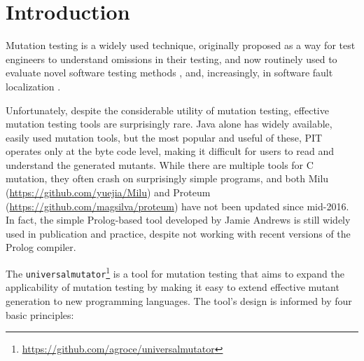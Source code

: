 \section{Introduction}

Mutation testing \cite{PracProg,Mut2000} is a widely used technique,
originally proposed as a way for test engineers to understand
omissions in their testing, and now routinely used to evaluate
novel software testing methods \cite{ISSTA13,ahmed_testedness}, and, increasingly, in software
fault localization \cite{Metallaxis,multilingual,TransProgTest}.

Unfortunately, despite the considerable utility of mutation testing,
effective mutation testing tools are surprisingly rare.  Java alone
has widely available, easily used mutation tools, but the most popular
and useful of these, PIT \cite{pittest} operates only at the byte code
level, making it difficult for users to read and understand the
generated mutants.  While there are multiple tools for C mutation,
they often crash on surprisingly simple programs, and both Milu
(\url{https://github.com/yuejia/Milu}) and Proteum
(\url{https://github.com/magsilva/proteum}) have not been updated
since mid-2016.  In fact, the simple Prolog-based tool developed by
Jamie Andrews \cite{mutant} is still widely used in publication and
practice, despite not working with recent versions of the Prolog compiler.

The {\tt universalmutator}\footnote{\url{https://github.com/agroce/universalmutator}} is a tool for
mutation testing \cite{PracProg,Mut2000} that aims to expand the
applicability of mutation testing by making it easy to extend
effective mutant generation to new programming languages.
The tool's design is informed by four basic principles:

